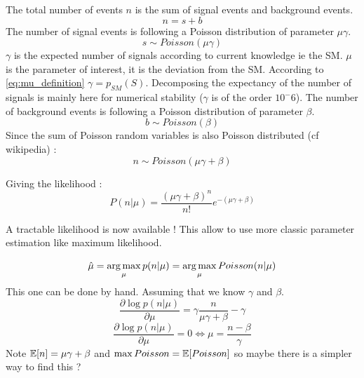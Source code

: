The total number of events $n$ is the sum of signal events and background events.
\begin{equation}
	n = s + b
\end{equation}
The number of signal events is following a Poisson distribution of parameter $\mu \gamma$.
\begin{equation}
	s \sim Poisson(\mu \gamma)
\end{equation}
$\gamma$ is the expected number of signals according to current knowledge ie the SM.
$\mu$ is the parameter of interest, it is the deviation from the SM.
According to \autoref{eq:mu_definition} $\gamma = p_{SM}(S)$.
Decomposing the expectancy of the number of signals is mainly here for numerical stability ($\gamma$ is of the order $10^-6$\needcite).
The number of background events is following a Poisson distribution of parameter $\beta$.
\begin{equation}
	b \sim Poisson(\beta)
\end{equation}
Since the sum of Poisson random variables is also Poisson distributed \needcite (cf wikipedia) :
\begin{equation}
	n \sim Poisson(\mu \gamma + \beta)
\end{equation}

Giving the likelihood :
\begin{equation}
	P(n| \mu) = \frac{(\mu \gamma +\beta)^n }{n!} e^{-(\mu \gamma +\beta)}
\end{equation}

A tractable likelihood is now available !
This allow to use more classic parameter estimation like maximum likelihood.

\begin{equation}
    \hat \mu = \operatorname*{arg\,max}_\mu p(n|\mu) =  \operatorname*{arg\,max}_\mu Poisson(n|\mu)
\end{equation}
This one can be done by hand. Assuming that we know $\gamma$ and  $\beta$.
\begin{equation}
    \frac{\partial \log p(n|\mu)}{\partial \mu} =  \gamma \frac{n}{\mu\gamma + \beta} - \gamma
\end{equation}
\begin{equation}
    \frac{\partial \log p(n|\mu)}{\partial \mu} = 0 \iff \mu = \frac{n-\beta}{\gamma}
\end{equation}
Note $\mathbb{E}[n] = \mu\gamma + \beta$ and $\max Poisson = \mathbb{E}[Poisson]$ so maybe there is a simpler way to find this ?






